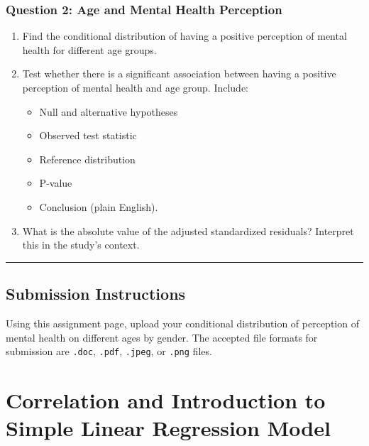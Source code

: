 \documentclass[oneside,openany]{book}
\providecommand{\tightlist}{%
  \setlength{\itemsep}{0pt}\setlength{\parskip}{0pt}}
\begin{document}
\subsection{Question 2: Age and Mental Health Perception}\label{question-2-age-and-mental-health-perception}

\begin{enumerate}
\def\labelenumi{\arabic{enumi}.}
\tightlist
\item
  Find the conditional distribution of having a positive perception of mental health for different age groups.
\item
  Test whether there is a significant association between having a positive perception of mental health and age group. Include:

  \begin{itemize}
  \tightlist
  \item
    Null and alternative hypotheses
  \item
    Observed test statistic
  \item
    Reference distribution
  \item
    P-value
  \item
    Conclusion (plain English).
  \end{itemize}
\item
  What is the absolute value of the adjusted standardized residuals? Interpret this in the study's context.
\end{enumerate}

\begin{center}\rule{0.5\linewidth}{0.5pt}\end{center}

\section{Submission Instructions}\label{submission-instructions}

Using this assignment page, upload your conditional distribution of perception of mental health on different ages by gender. The accepted file formats for  submission are \texttt{.doc}, \texttt{.pdf}, \texttt{.jpeg}, or \texttt{.png} files.

\chapter{Correlation and Introduction to Simple Linear Regression Model}\label{activity-10---correlation-and-introduction-to-simple-linear-regression-model}
\end{document}
